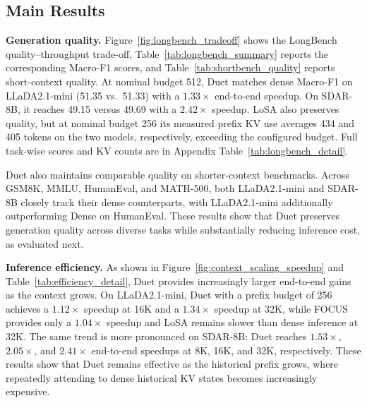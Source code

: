 \subsection{Main Results}

\textbf{Generation quality.}
Figure~\ref{fig:longbench_tradeoff} shows the LongBench quality--throughput trade-off, Table~\ref{tab:longbench_summary} reports the corresponding Macro-F1 scores, and Table~\ref{tab:shortbench_quality} reports short-context quality. At nominal budget 512, Duet matches dense Macro-F1 on LLaDA2.1-mini (51.35 vs.\ 51.33) with a $1.33\times$ end-to-end speedup. On SDAR-8B, it reaches 49.15 versus 49.69 with a $2.42\times$ speedup. LoSA also preserves quality, but at nominal budget 256 its measured prefix KV use averages 434 and 405 tokens on the two models, respectively, exceeding the configured budget. Full task-wise scores and KV counts are in Appendix Table~\ref{tab:longbench_detail}.

Duet also maintains comparable quality on shorter-context benchmarks. Across GSM8K, MMLU, HumanEval, and MATH-500, both LLaDA2.1-mini and SDAR-8B closely track their dense counterparts, with LLaDA2.1-mini additionally outperforming Dense on HumanEval. These results show that Duet preserves generation quality across diverse tasks while substantially reducing inference cost, as evaluated next.

\textbf{Inference efficiency.}
As shown in Figure~\ref{fig:context_scaling_speedup} and Table~\ref{tab:efficiency_detail}, Duet provides increasingly larger end-to-end gains as the context grows. On LLaDA2.1-mini, Duet with a prefix budget of 256 achieves a $1.12\times$ speedup at 16K and a $1.34\times$ speedup at 32K, while FOCUS provides only a $1.04\times$ speedup and LoSA remains slower than dense inference at 32K. The same trend is more pronounced on SDAR-8B: Duet reaches $1.53\times$, $2.05\times$, and $2.41\times$ end-to-end speedups at 8K, 16K, and 32K, respectively. These results show that Duet remains effective as the historical prefix grows, where repeatedly attending to dense historical KV states becomes increasingly expensive.

